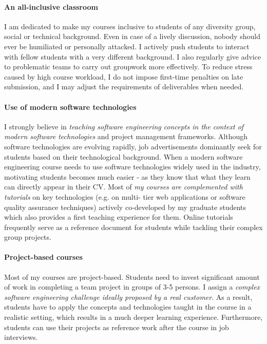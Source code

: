 \paragraph{An all-inclusive classroom}
I am dedicated to make my courses inclusive to students of any diversity group, social or technical background. Even in case of a lively discussion, nobody should ever be humiliated or personally attacked. I actively push students to interact with fellow students with a very different background. I also regularly give advice to problematic teams to carry out groupwork more effectively. To reduce stress caused by high course workload, I do not impose first-time penalties on late submission, and I may adjust the requirements of deliverables when needed. 


\paragraph{Use of modern software technologies}
I strongly believe in \emph{teaching software engineering concepts in the context of modern software technologies} and 
project management frameworks. Although software technologies are evolving rapidly, job advertisements dominantly seek 
for students based on their technological background. When a modern software engineering course needs to use software 
technologies widely used in the industry, motivating students becomes much easier - as they know that what they learn can 
directly appear in their CV. Most of \emph{my courses are complemented with tutorials} on key technologies (e.g. on multi-
tier web applications or software quality assurance techniques) actively co-developed by my graduate students which also 
provides a first teaching experience for them. Online tutorials frequently serve as a reference document for students while 
tackling their complex group projects.

\paragraph{Project-based courses}
Most of my courses are project-based. Students need to invest significant amount of work in completing a team 
project in groups of 3-5 persons. I assign a \emph{complex software engineering challenge ideally proposed by a 
real customer}. As a result, students have to apply the concepts and technologies taught in the course in a realistic setting, 
which results in a much deeper learning experience. Furthermore, students can use their projects as reference work after 
the course in job interviews. 

